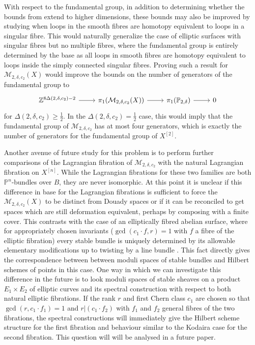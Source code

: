 \documentclass{article}[12pt]
\theoremstyle{definition}
\theoremstyle{remark}
\newcommand \Z{\mathbb Z}
\numberwithin{equation}{section}
\newcommand \mc{\mathcal}
\newcommand \mb{\mathbb}
\begin{document}
With respect to the fundamental group, in addition to determining whether the bounds from \cite{Arapura} extend to higher dimensions, these bounds may also be improved by studying when loops in the smooth fibres are homotopy equivalent to loops in a singular fibre. This would naturally generalize the case of elliptic surfaces with singular fibres but no multiple fibres, where the fundamental group is entirely determined by the base as all loops in smooth fibres are homotopy equivalent to loops inside the simply connected singular fibres. Proving such a result for $\mc{M}_{2,\delta,c_2}(X)$ would improve the bounds on the number of generators of the fundamental group to $$\begin{tikzcd}\Z^{8\Delta(2,\delta,c_2)-2} \arrow[r] & \pi_1(\mc{M}_{2,\delta,c_2}(X)) \arrow[r] & \pi_1(\mb{P}_{2,\delta}) \arrow[r] & 0
\end{tikzcd}$$
for $\Delta(2,\delta,c_2)\geq \frac{1}{2}$. In the $\Delta(2,\delta,c_2)=\frac{1}{2}$ case, this would imply that the fundamental group of $\mc{M}_{2,\delta,c_2}$ has at most four generators, which is exactly the number of generators for the fundamental group of $X^{[2]}$.

Another avenue of future study for this problem is to perform further comparisons of the Lagrangian fibration of $\mc{M}_{2,\delta,c_2}$ with the natural Lagrangian fibration on $X^{[n]}$. While the Lagrangian fibrations for these two families are both $\mb{P}^n$-bundles over $B$, they are never isomorphic. At this point it is unclear if this difference in base for the Lagrangian fibrations is sufficient to force the $\mc{M}_{2,\delta,c_2}(X)$ to be distinct from Douady spaces or if it can be reconciled to get spaces which are still deformation equivalent, perhaps by composing with a finite cover. This contrasts with the case of an elliptically fibred abelian surface, where for appropriately chosen invariants ($\gcd(c_1\cdot f, r)=1$ with $f$ a fibre of the elliptic fibration) every stable bundle is uniquely determined by its allowable elementary modifications up to twisting by a line bundle \cite[Chapter 8, Proposition 9]{Fried}. This fact directly gives the correspondence between between moduli spaces of stable bundles and Hilbert schemes of points in this case. One way in which we can investigate this difference in the future is to look moduli spaces of stable sheaves on a product $E_1\times E_2$ of elliptic curves and its spectral construction with respect to both natural elliptic fibrations. If the rank $r$ and first Chern class $c_1$ are chosen so that $\gcd(r,c_1\cdot f_1)=1$ and $r | (c_1\cdot f_2)$ with $f_1$ and $f_2$ general fibres of the two fibrations, the spectral constructions will immediately give the Hilbert scheme structure for the first fibration and behaviour similar to the Kodaira case for the second fibration. This question will will be analysed in a future paper.

	
	
\end{document}
